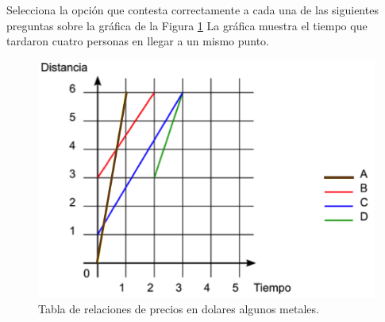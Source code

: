 Selecciona la opci\'on que contesta correctamente a cada una de las siguientes preguntas sobre la gr\'afica de la Figura \ref{fig:SINMAT1_U3_AC73_IMG1}
La gráfica muestra el tiempo que tardaron cuatro personas en llegar a un mismo punto.

\begin{multicols}{2}
    \begin{figure}[H]
        \centering
        \includegraphics[width=0.9\linewidth]{../images/SINMAT1_U3_AC73_IMG1}
        \caption{Tabla de relaciones de precios en dolares algunos metales.}
        \label{fig:SINMAT1_U3_AC73_IMG1}
    \end{figure}

    \begin{parts}
        
        
        
        
        
        
        \columnbreak

        
        
        
        
    \end{parts}
\end{multicols}